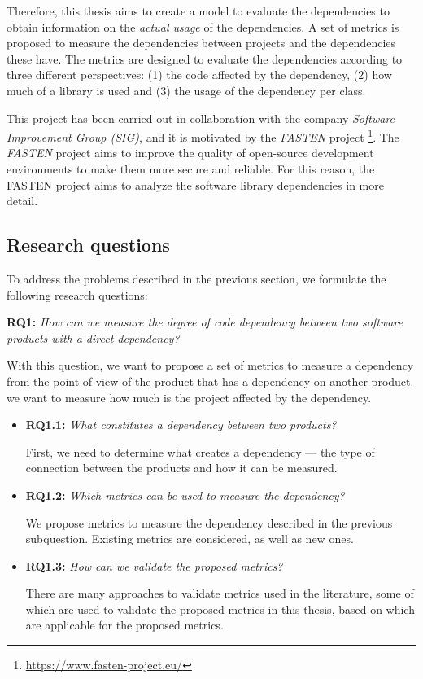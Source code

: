 \blankl
Therefore, this thesis aims to create a model to evaluate the dependencies to obtain information on the \textit{actual usage} of the dependencies. A set of metrics is proposed to measure the dependencies between projects and the dependencies these have. The metrics are designed to evaluate the dependencies according to three different perspectives: (1) the code affected by the dependency, (2) how much of a library is used and (3) the usage of the dependency per class.

This project has been carried out in collaboration with the company \textit{Software Improvement Group (SIG)}, and it is motivated by the \textit{FASTEN} project \footnote{\url{https://www.fasten-project.eu/}}. The \textit{FASTEN} project aims to improve the quality of open-source development environments to make them more secure and reliable. For this reason, the FASTEN project aims to analyze the software library dependencies in more detail.

\subsection{Research questions}
To address the problems described in the previous section, we formulate the following research questions:

\blankl
\textbf{RQ1:} \textit{How can we measure the degree of code dependency between two software products with a direct dependency?}

\blankls
With this question, we want to propose a set of metrics to measure a dependency from the point of view of the product that has a dependency on another product. we want to measure how much is the project affected by the dependency.

\begin{itemize}
  \item \textbf{RQ1.1:} \textit{What constitutes a dependency between two products?}

  First, we need to determine what creates a dependency — the type of connection between the products and how it can be measured.

  \item \textbf{RQ1.2:} \textit{Which metrics can be used to measure the dependency?}

  We propose metrics to measure the dependency described in the previous subquestion. Existing metrics are considered, as well as new ones.

  \item \textbf{RQ1.3:} \textit{How can we validate the proposed metrics?}

  There are many approaches to validate metrics used in the literature, some of which are used to validate the proposed metrics in this thesis, based on which are applicable for the proposed metrics.
\end{itemize}


